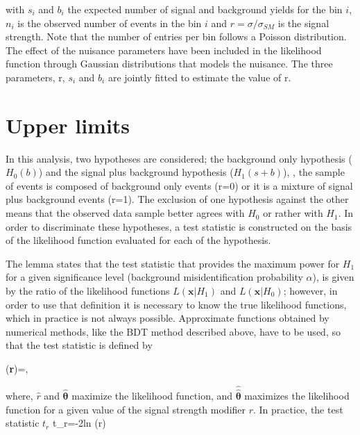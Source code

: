 \noindent with $s_i$ and $b_i$ the expected number of signal and background yields for the bin $i$, $n_i$ is the observed number of events in the bin $i$ and $r = \sigma/\sigma_{SM}$ is the signal strength. Note that the number of entries per bin follows a Poisson distribution. The effect of the nuisance parameters have been included in the likelihood function through Gaussian distributions that models the nuisance. The three parameters, r, $s_i$ and $b_i$ are jointly fitted to estimate the value of r.


\section{Upper limits }

In this analysis, two hypotheses are considered; the background only hypothesis ($H_0(b)$) and the signal plus background hypothesis ($H_1(s+b)$), \ie, the sample of events is composed of background only events (r=0) or it is a mixture of signal plus background events (r=1). The exclusion of one hypothesis against the other means that the observed data sample better agrees with $H_0$ or rather with $H_1$. In order to discriminate these hypotheses, a test statistic is constructed on the basis of the likelihood function evaluated for each of the hypothesis.  

The  lemma \cite{npl} states that the test statistic that provides the maximum power for $H_1$ for a given significance level (background misidentification probability $\alpha$), is given by the ratio of the likelihood functions $L(\textbf{x}|H_1)$ and $L(\textbf{x}|H_0)$; however, in order to use that definition it is necessary to know the true likelihood functions, which in practice is not always possible. Approximate functions obtained by numerical methods, like the BDT method described above, have to be used, so that the  test statistic is defined by 

\beqn
\lambda(\textbf{r})=,
\eeqn

\noindent where, $\hat r$ and $\hat{\bm{\theta}}$ maximize the likelihood function, and $\hat{\hat{\bm{\theta}}}$ maximizes the likelihood function for a given value of the signal strength modifier $r$. In practice, the test statistic $t_r$
\beqn
t_r=-2\textrm{ln} \lambda(r)  
\eeqn

